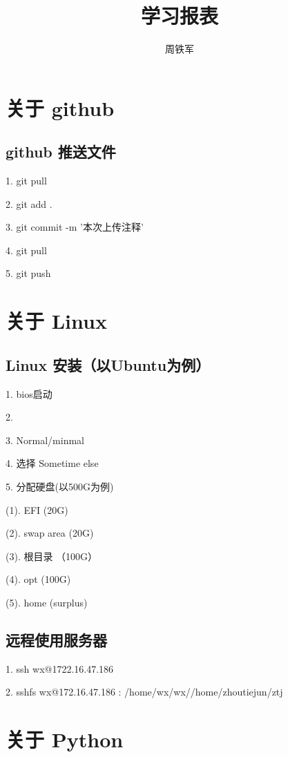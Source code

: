 \documentclass[12pt,a4paper]{article}
\title{学习报表}
\author{周铁军}
\date{\chntoday}
\begin{document}
\maketitle
\newpage


\section{关于 github}

\subsection{github 推送文件}

1. git pull

2. git add .

3. git commit -m '本次上传注释'

4. git pull

5. git push

\section{关于 Linux}

\subsection{Linux 安装（以Ubuntu为例）}

1. bios启动

2. 

3. Normal/minmal

4. 选择 Sometime else

5. 分配硬盘(以500G为例)

\qquad (1). EFI (20G)

\qquad (2). swap area (20G)

\qquad (3). 根目录 （100G）

\qquad (4). opt (100G)

\qquad (5). home (surplus)

\subsection{远程使用服务器}

1. ssh wx@1722.16.47.186

2. sshfs wx@172.16.47.186 : /home/wx/wx/\qquad /home/zhoutiejun/ztj

\section{关于 Python}
\end{document}
